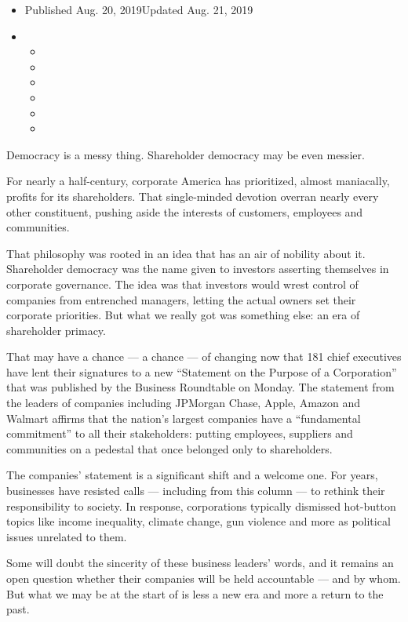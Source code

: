 \begin{itemize}
\item
  Published Aug. 20, 2019Updated Aug. 21, 2019
\item
  \begin{itemize}
  \item
  \item
  \item
  \item
  \item
  \item
  \end{itemize}
\end{itemize}

Democracy is a messy thing. Shareholder democracy may be even messier.

For nearly a half-century, corporate America has prioritized, almost
maniacally, profits for its shareholders. That single-minded devotion
overran nearly every other constituent, pushing aside the interests of
customers, employees and communities.

That philosophy was rooted in an idea that has an air of nobility about
it. Shareholder democracy was the name given to investors asserting
themselves in corporate governance. The idea was that investors would
wrest control of companies from entrenched managers, letting the actual
owners set their corporate priorities. But what we really got was
something else: an era of shareholder primacy.

That may have a chance --- a chance --- of changing now that 181 chief
executives have lent their signatures to a new ``Statement on the
Purpose of a Corporation'' that was published by the Business Roundtable
on Monday. The statement from the leaders of companies including
JPMorgan Chase, Apple, Amazon and Walmart affirms that the nation's
largest companies have a ``fundamental commitment'' to all their
stakeholders: putting employees, suppliers and communities on a pedestal
that once belonged only to shareholders.

The companies' statement is a significant shift and a welcome one. For
years, businesses have resisted calls --- including from this column ---
to rethink their responsibility to society. In response, corporations
typically dismissed hot-button topics like income inequality, climate
change, gun violence and more as political issues unrelated to them.

Some will doubt the sincerity of these business leaders' words, and it
remains an open question whether their companies will be held
accountable --- and by whom. But what we may be at the start of is less
a new era and more a return to the past.

